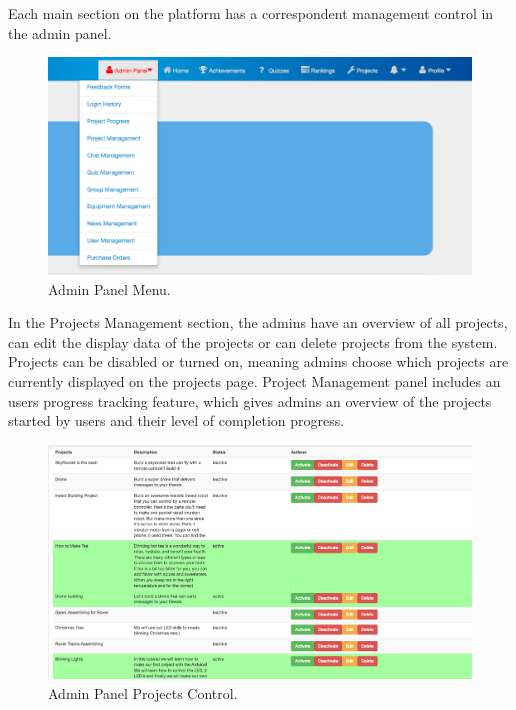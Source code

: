 Each main section on the platform has a correspondent management control in the admin panel.

\begin{figure}
\includegraphics[width=1\linewidth]{images/ui/AdminPanelMenu.png}
\caption{Admin Panel Menu.}
\label{fig:AdminPanelMenu}
\end{figure} 

In the Projects Management section, the admins have an overview of all projects, can edit the display data of the projects or can delete projects from the system. Projects can be
disabled or turned on, meaning admins choose which projects are currently displayed on the projects page. 
Project Management panel includes an users progress tracking feature, which gives admins an overview of the projects started by users and their level of completion progress.
\\

\begin{figure}
\includegraphics[width=1\linewidth]{images/ui/AdminPanelProjects.png}
\caption{Admin Panel Projects Control.}
\label{fig:AdminPanelProjects}
\end{figure} 

